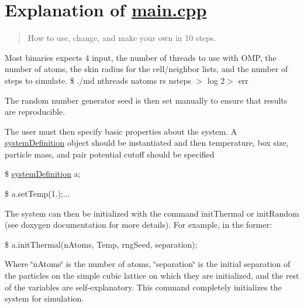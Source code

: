 \section*{Explanation of \hyperlink{main_8cpp_source}{main.\-cpp}}

\begin{quotation}
How to use, change, and make your own in 10 steps.

\end{quotation}



\begin{DoxyEnumerate}
\item Most binaries expects 4 input, the number of threads to use with O\-M\-P, the number of atoms, the skin radius for the cell/neighbor lists, and the number of steps to simulate. \$ ./md nthreads natoms rs nsteps $>$ log 2$>$ err
\end{DoxyEnumerate}


\begin{DoxyEnumerate}
\item The random number generator seed is then set manually to ensure that results are reproducible.
\end{DoxyEnumerate}


\begin{DoxyEnumerate}
\item The user must then specify basic properties about the system. A \hyperlink{classsystem_definition}{system\-Definition} object should be instantiated and then temperature, box size, particle mass, and pair potential cutoff should be specified

\$ \hyperlink{classsystem_definition}{system\-Definition} a;

\$ a.\-set\-Temp(1.);...
\end{DoxyEnumerate}


\begin{DoxyEnumerate}
\item The system can then be initialized with the command init\-Thermal or init\-Random (see doxygen documentation for more details). For example, in the former\-:

\$ a.\-init\-Thermal(n\-Atoms, Temp, rng\-Seed, separation);
\end{DoxyEnumerate}


\begin{DoxyEnumerate}
\item Where \char`\"{}n\-Atoms\char`\"{} is the number of atoms, \char`\"{}separation\char`\"{} is the initial separation of the particles on the simple cubic lattice on which they are initialized, and the rest of the variables are self-\/explanatory. This command completely initializes the system for simulation.
\end{DoxyEnumerate}


